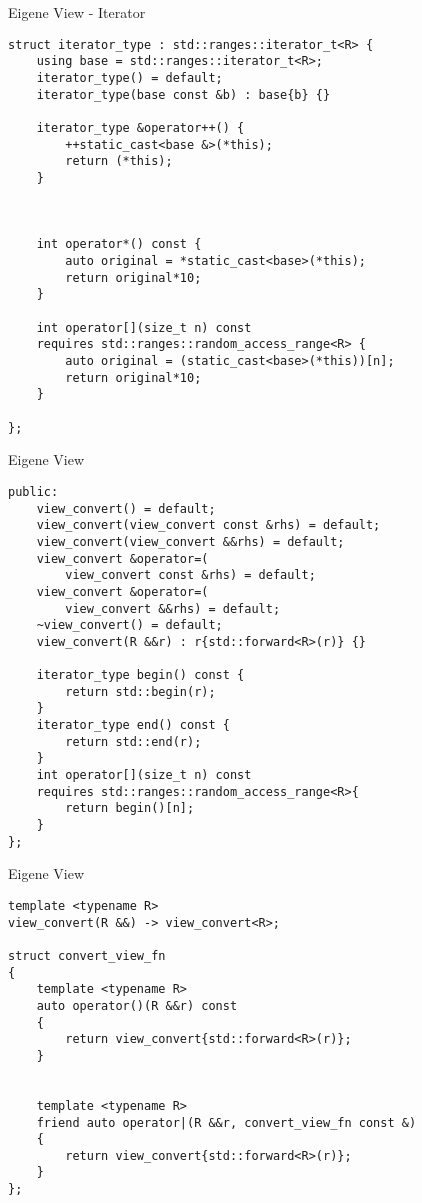 \begin{frame}{Eigene View - Iterator}
    \begin{verbatim}
struct iterator_type : std::ranges::iterator_t<R> {
    using base = std::ranges::iterator_t<R>;
    iterator_type() = default;
    iterator_type(base const &b) : base{b} {}

    iterator_type &operator++() {
        ++static_cast<base &>(*this);
        return (*this);
    }



    int operator*() const {
        auto original = *static_cast<base>(*this);
        return original*10;
    }

    int operator[](size_t n) const
    requires std::ranges::random_access_range<R> {
        auto original = (static_cast<base>(*this))[n];
        return original*10;
    }

};
    \end{verbatim}
\end{frame}

\begin{frame}{Eigene View}
    \begin{verbatim}
public:
    view_convert() = default;
    view_convert(view_convert const &rhs) = default;
    view_convert(view_convert &&rhs) = default;
    view_convert &operator=(
        view_convert const &rhs) = default;
    view_convert &operator=(
        view_convert &&rhs) = default;
    ~view_convert() = default;
    view_convert(R &&r) : r{std::forward<R>(r)} {}

    iterator_type begin() const {
        return std::begin(r);
    }
    iterator_type end() const {
        return std::end(r);
    }
    int operator[](size_t n) const
    requires std::ranges::random_access_range<R>{
        return begin()[n];
    }
};
    \end{verbatim}
\end{frame}

\begin{frame}{Eigene View}
    \begin{verbatim}
template <typename R>
view_convert(R &&) -> view_convert<R>;

struct convert_view_fn
{
    template <typename R>
    auto operator()(R &&r) const
    {
        return view_convert{std::forward<R>(r)};
    }

    
    template <typename R>
    friend auto operator|(R &&r, convert_view_fn const &)
    {
        return view_convert{std::forward<R>(r)};
    }
};
    \end{verbatim}
\end{frame}